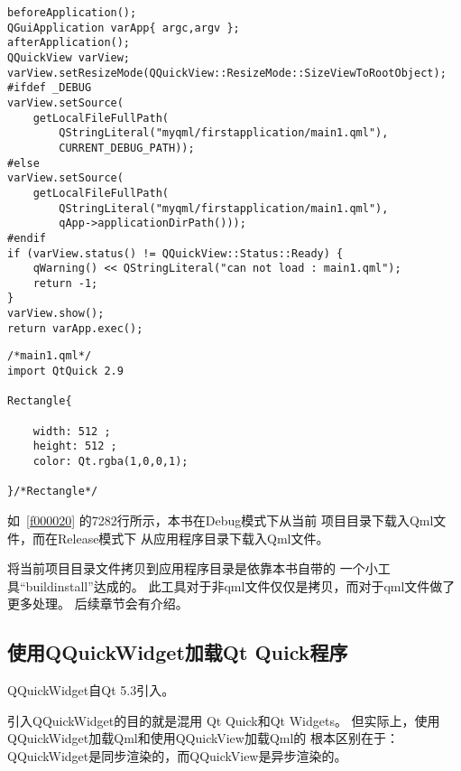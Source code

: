 \FloatBarrier
\begin{lstlisting}[label=f000020,
caption=GoodLuck,
title=\lstlistingname\ \thelstlisting
,firstnumber=67]
beforeApplication();
QGuiApplication varApp{ argc,argv };
afterApplication();
QQuickView varView;
varView.setResizeMode(QQuickView::ResizeMode::SizeViewToRootObject);
#ifdef _DEBUG
varView.setSource(
    getLocalFileFullPath(
        QStringLiteral("myqml/firstapplication/main1.qml"),
        CURRENT_DEBUG_PATH));
#else
varView.setSource(
    getLocalFileFullPath(
        QStringLiteral("myqml/firstapplication/main1.qml"),
        qApp->applicationDirPath()));
#endif
if (varView.status() != QQuickView::Status::Ready) {
    qWarning() << QStringLiteral("can not load : main1.qml");
    return -1;
}
varView.show();
return varApp.exec();
\end{lstlisting}          %
\FloatBarrier
\begin{lstlisting}[label=f000023,
caption=GoodLuck,
title=\lstlistingname\ \thelstlisting
]
/*main1.qml*/
import QtQuick 2.9

Rectangle{

    width: 512 ;
    height: 512 ;
    color: Qt.rgba(1,0,0,1);

}/*Rectangle*/
\end{lstlisting}          %

如\lstlistingname\ \ref{f000020}
的72\raisebox{0.16ex}{\sourcefonttwo\~{}}82行所示，本书在Debug模式下从当前
项目目录下载入Qml文件，而在Release模式下
从应用程序目录下载入Qml文件。

将当前项目目录文件拷贝到应用程序目录是依靠本书自带的
一个小工具“build\underline{\hspace{0.5em}}install”达成的。
此工具对于非qml文件仅仅是拷贝，而对于qml文件做了更多处理。
后续章节会有介绍。

\FloatBarrier
\subsection{
使用QQuickWidget加载Qt Quick程序
}\label{ss001110}


QQuickWidget自Qt 5.3引入。

引入QQuickWidget的目的就是混用
Qt Quick和Qt Widgets。
但实际上，使用QQuickWidget加载Qml和使用QQuickView加载Qml的
根本区别在于：
QQuickWidget是同步渲染的，而QQuickView是异步渲染的。

